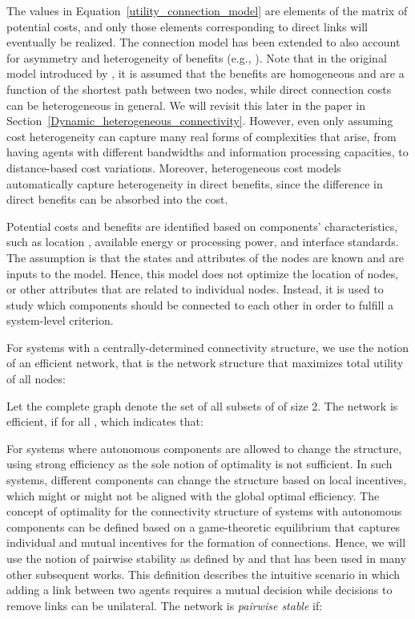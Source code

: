 \documentclass[journal,onecolumn]{IEEEtran}
\theoremstyle{plain}
\begin{document}
The  values in Equation~\ref{utility_connection_model} are elements of the matrix of potential costs, and only those elements corresponding to direct links will eventually be realized. The connection model has been extended to also account for asymmetry and heterogeneity of benefits (e.g., \cite{persitz2010core}). Note that in the original model introduced by \cite{jackson1996strategic}, it is assumed that the benefits are homogeneous and are a function of the shortest path between two nodes, while direct connection costs can be heterogeneous in general.   We will revisit this later in the paper in Section~\ref{Dynamic_heterogeneous_connectivity}. However, even only assuming cost heterogeneity can capture many real forms of complexities that arise, from having agents with different bandwidths and information processing capacities, to distance-based cost variations. Moreover, heterogeneous cost models automatically capture heterogeneity in direct benefits, since the difference in direct benefits can be absorbed into the cost.

Potential costs and benefits are identified based on components' characteristics, such as location \citep{johnson2003spatial}, available energy or processing power, and interface standards. The assumption is that the states and attributes of the nodes are known and are inputs to the model. Hence, this model does not optimize the location of nodes, or other attributes that are related to individual nodes. Instead, it is used to study which components should be connected to each other in order to fulfill a system-level criterion. 



For systems with a centrally-determined connectivity structure, we use the notion of an efficient network, that is the network structure that maximizes total utility of all nodes: 

Let the complete graph  denote the set of all subsets of  of size 2. The network  is efficient, if  for all , which indicates that:
 


For systems where autonomous components are allowed to change the structure, using strong efficiency as the sole notion of optimality is not sufficient. In such systems, different components can change the structure based on local incentives, which might or might not be aligned with the global optimal efficiency. The concept of optimality for the connectivity structure of systems with autonomous components can be defined based on a game-theoretic equilibrium that captures individual and mutual incentives for the formation of connections. Hence, we will use the notion of pairwise stability as defined by \cite{jackson1996strategic} and that has been used in many other subsequent works. This definition describes the intuitive scenario in which adding a link between two agents requires a mutual decision while decisions to remove links can be unilateral.
The network  is \textit{pairwise stable} if:
\end{document}
